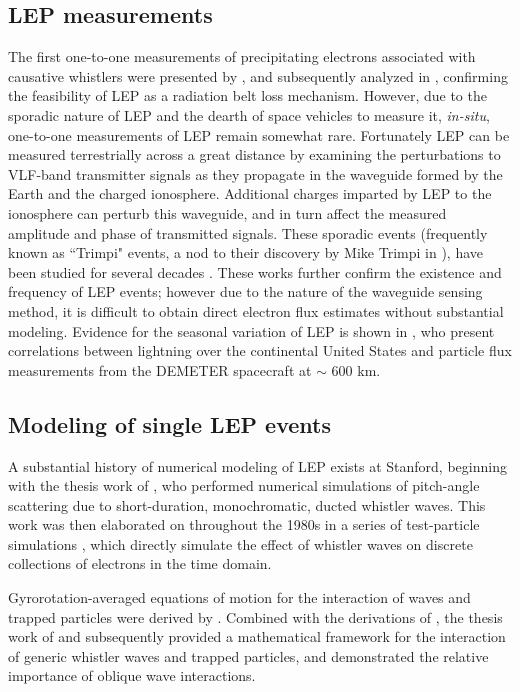 
\subsection{LEP measurements}
The first one-to-one measurements of precipitating electrons associated with causative whistlers were presented by \cite{Voss1984}, and subsequently analyzed in \cite{Voss1998}, confirming the feasibility of LEP as a radiation belt loss mechanism. However, due to the sporadic nature of LEP and the dearth of space vehicles to measure it, \emph{in-situ}, one-to-one measurements of LEP remain somewhat rare.
Fortunately LEP can be measured terrestrially across a great distance by examining the perturbations to VLF-band transmitter signals as they propagate in the waveguide formed by the Earth and the charged ionosphere. Additional charges imparted by LEP to the ionosphere can perturb this waveguide, and in turn affect the measured amplitude and phase of transmitted signals. These sporadic events (frequently known as ``Trimpi" events, a nod to their discovery by Mike Trimpi in \cite{Trimpi1973}), have been studied for several decades \citep{Trimpi1973, Carpenter1984, Inan1988, Burgess1993}. These works further confirm the existence and frequency of LEP events; however due to the nature of the waveguide sensing method, it is difficult to obtain direct electron flux estimates without substantial modeling.
Evidence for the seasonal variation of LEP is shown in \cite{Gemelos2009}, who present correlations between lightning over the continental United States and particle flux measurements from the DEMETER spacecraft at $\sim$ 600 km.

\subsection{Modeling of single LEP events}
A substantial history of numerical modeling of LEP exists at Stanford, beginning with the thesis work of \cite{Inan1977}, who performed numerical simulations of pitch-angle scattering due to short-duration, monochromatic, ducted whistler waves. This work was then elaborated on throughout the 1980s in a series of test-particle simulations \citep{Inan1982, Chang1983, Chang1983b, Chang1985, Inan1989}, which directly simulate the effect of whistler waves on discrete collections of electrons in the time domain.

Gyrorotation-averaged equations of motion for the interaction of waves and trapped particles were derived by \cite{Bell1984}. Combined with the derivations of \cite{Ristic1992}, the thesis work of \cite{Ristic1993} and subsequently \cite{Ristic1998} provided a mathematical framework for the interaction of generic whistler waves and trapped particles, and demonstrated the relative importance of oblique wave interactions. 

